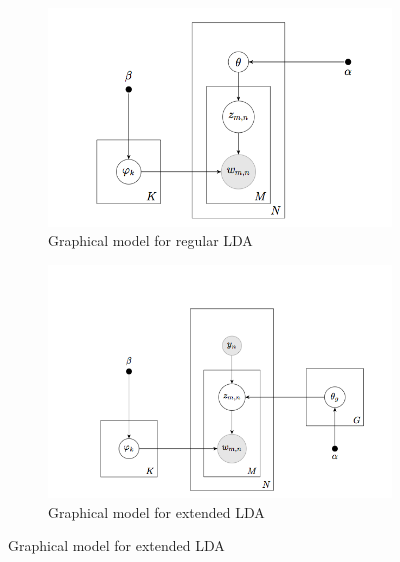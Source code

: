 \begin{figure}[htp]
	\centering
	\begin{subfigure}[b]{0.5\textwidth}
		\includegraphics[width=\textwidth]{regular_lda_img}
		\caption{Graphical model for regular LDA}
		\label{fig:graphical-model}
	\end{subfigure}%
        \begin{subfigure}[b]{0.5\textwidth}
		\includegraphics[width=\textwidth]{extended_lda_img}
		\caption{Graphical model for extended LDA}
		\label{fig:graphical-model_extended}
	\end{subfigure}
\end{figure}


